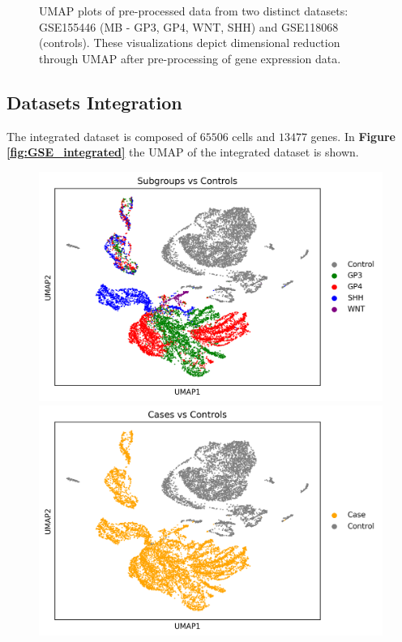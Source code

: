 \documentclass[10pt]{SelfArx} %
\begin{document}
\begin{figure}[H]
\begin{minipage}{0.48\textwidth}
    \end{minipage}
    \caption{UMAP plots of pre-processed data from two distinct datasets: GSE155446 (MB - GP3, GP4, WNT, SHH) and GSE118068 (controls). These visualizations depict dimensional reduction through UMAP after pre-processing of gene expression data.}
    \label{fig:GSE_normalized}
\end{figure}

\subsection{Datasets Integration}\label{sec:integration_results}
The integrated dataset is composed of $65506$ cells and $13477$ genes. In \textbf{Figure \ref{fig:GSE_integrated}} the UMAP of the integrated dataset is shown. 

\begin{figure}[H]
    \begin{minipage}{0.48\textwidth}
        \centering
        \includegraphics[width=\textwidth]{project-report/figures/umap/GSE_integrated_umap_subtypes_controls.png}
    \end{minipage}\hfill
    \begin{minipage}{0.48\textwidth}
        \centering
        \includegraphics[width=\textwidth]{project-report/figures/umap/GSE_integrated_umap_cases_controls.png}

\end{minipage}
\end{figure}
\end{document}
